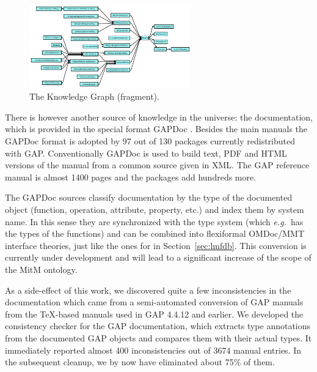 \begin{figure}[ht]\centering
  \includegraphics[width=7cm]{gap-ismagma}
  \caption{The \GAP Knowledge Graph (fragment).\label{fig:gap-ismagma}}
\end{figure}


There is however another source of knowledge in the \GAP universe: the documentation, which is
provided in the special format GAPDoc \cite{gapdoc}. Besides the main manuals the GAPDoc
format is adopted by 97 out of 130 packages currently redistributed with
GAP. Conventionally GAPDoc is used to build text, PDF and HTML versions of the manual
from a common source given in XML. The GAP reference manual is almost 1400 pages and the
packages add hundreds more.

The GAPDoc sources classify documentation by the type of the documented object (function,
operation, attribute, property, etc.) and index them by system name. In this sense they
are synchronized with the type system (which \emph{e.g.}\ has the types of the functions) and can
be combined into flexiformal OMDoc/MMT interface theories, just like the ones for \LMFDB
in Section~\ref{sec:lmfdb}. This conversion is currently under development and will lead
to a significant increase of the scope of the MitM ontology. 

As a side-effect of this work, we discovered quite a few inconsistencies in the \GAP
documentation which came from a semi-automated conversion of GAP manuals from the
\TeX-based manuals used in GAP 4.4.12 and earlier.  We developed the consistency checker
for the GAP documentation, which extracts type annotations from the documented GAP objects
and compares them with their actual types. It immediately reported almost 400
inconsistencies out of 3674 manual entries. In the subsequent cleanup, we by now have
eliminated about 75\% of them. 


